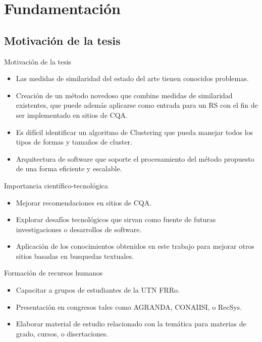 \section{Fundamentación}

\subsection{Motivación de la tesis}
\begin{frame}{Motivación de la tesis}
	\scriptsize
	\begin{itemize} [<+>]
		\item Las medidas de similaridad del estado del arte tienen conocidos problemas.
		\item Creación de un método novedoso que combine medidas de similaridad existentes, que puede además aplicarse como entrada para un RS con el fin de ser implementado en sitios de CQA.
		\item Es difícil identificar un algoritmo de Clustering que pueda manejar todos los tipos de formas y tamaños de cluster.
		\item Arquitectura de software que soporte el procesamiento del método propuesto de una forma eficiente y escalable.
	\end{itemize}
\end{frame}

\begin{frame}{Importancia científico-tecnológica}
	\scriptsize
	\begin{itemize} [<+>]
		\item Mejorar recomendaciones en sitios de CQA.
		\item Explorar desafíos tecnológicos que sirvan como fuente de futuras investigaciones o desarrollos de software.
		\item Aplicación de los conocimientos obtenidos en este trabajo para mejorar otros sitios basadas en busquedas textuales.
	\end{itemize}
\end{frame}

\begin{frame}{Formación de recursos humanos}
	\scriptsize
	\begin{itemize} [<+>]
		\item Capacitar a grupos de estudiantes de la UTN FRRo.
		\item Presentación en congresos tales como AGRANDA, CONAIISI, o RecSys.
		\item Elaborar material de estudio relacionado con la temática para materias de grado, cursos, o disertaciones.
	\end{itemize}
\end{frame}